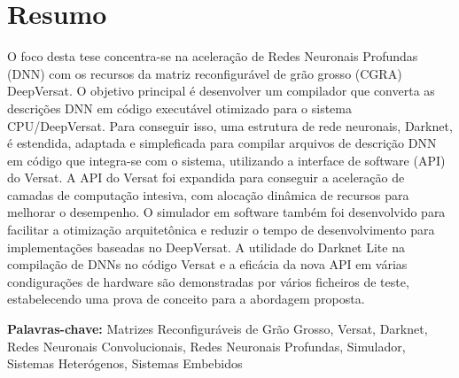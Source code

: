 
\section*{Resumo}



O foco desta tese concentra-se na aceleração de Redes Neuronais Profundas (DNN) com os recursos da matriz reconfigurável de grão grosso (CGRA) DeepVersat.
O objetivo principal é desenvolver um compilador que converta as descrições DNN em código executável otimizado para o sistema CPU/DeepVersat. Para conseguir isso, uma estrutura de rede neuronais, Darknet, é estendida, adaptada e simpleficada para compilar arquivos de descrição DNN em código que integra-se com o sistema, utilizando a interface de software (API) do Versat. A API do Versat foi expandida para conseguir a aceleração de camadas de computação intesiva, com alocação dinâmica de recursos para melhorar o desempenho. O simulador em software também foi desenvolvido para facilitar a otimização  arquitetônica e reduzir o tempo de desenvolvimento para implementações baseadas no DeepVersat. A utilidade do Darknet Lite na compilação de DNNs no código Versat e a eficácia da nova API em várias condigurações de hardware são demonstradas por vários ficheiros de teste, estabelecendo uma prova de conceito para a abordagem proposta.


\vfill

\textbf{\Large Palavras-chave:} Matrizes Reconfiguráveis de Grão Grosso, Versat, Darknet, Redes Neuronais Convolucionais, Redes Neuronais Profundas, Simulador, Sistemas Heterógenos, Sistemas Embebidos

